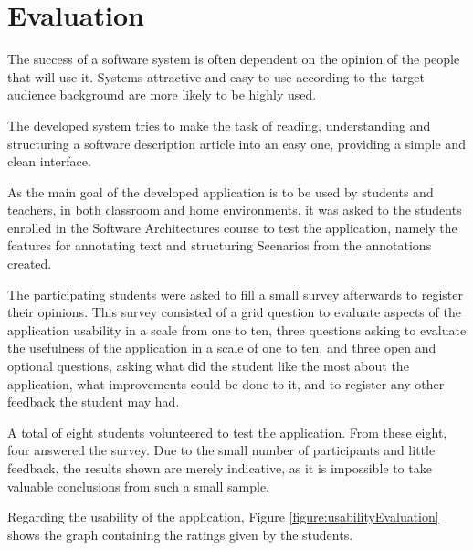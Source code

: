 
\chapter{Evaluation}
\label{chapter:evaluation}

The success of a software system is often dependent on the opinion of the people that will use it. Systems attractive and easy to use according to the target audience background are more likely to be highly used.

The developed system tries to make the task of reading, understanding and structuring a software description article into an easy one, providing a simple and clean interface.

As the main goal of the developed application is to be used by students and teachers, in both classroom and home environments, it was asked to the students enrolled in the Software Architectures course to test the application, namely the features for annotating text and structuring Scenarios from the annotations created.

The participating students were asked to fill a small survey afterwards to register their opinions.
This survey consisted of a grid question to evaluate aspects of the application usability in a scale from one to ten, three questions asking to evaluate the usefulness of the application in a scale of one to ten, and three open and optional questions, asking what did the student like the most about the application, what improvements could be done to it, and to register any other feedback the student may had.

A total of eight students volunteered to test the application. From these eight, four answered the survey. Due to the small number of participants and little feedback, the results shown are merely indicative, as it is impossible to take valuable conclusions from such a small sample.

Regarding the usability of the application, Figure \ref{figure:usabilityEvaluation} shows the graph containing the ratings given by the students.

